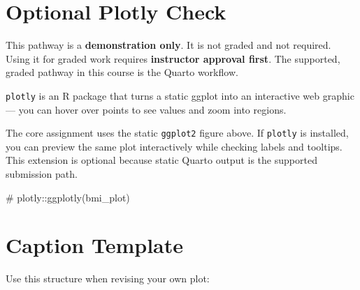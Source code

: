 \documentclass[
  letterpaper,
  DIV=11,
  numbers=noendperiod,
  oneside]{scrreprt}
\newenvironment{Shaded}{\begin{snugshade}}{\end{snugshade}}
\newcommand{\CommentTok}[1]{\textcolor[rgb]{0.37,0.37,0.37}{#1}}
\begin{document}
\section*{Optional Plotly Check}\label{optional-plotly-check}


\begin{tcolorbox}[enhanced jigsaw, title=\textcolor{quarto-callout-warning-color}{\faExclamationTriangle}\hspace{0.5em}{Demo only --- not graded}, arc=.35mm, toptitle=1mm, colframe=quarto-callout-warning-color-frame, toprule=.15mm, leftrule=.75mm, bottomtitle=1mm, opacityback=0, bottomrule=.15mm, coltitle=black, breakable, opacitybacktitle=0.6, titlerule=0mm, colback=white, left=2mm, colbacktitle=quarto-callout-warning-color!10!white, rightrule=.15mm]

This pathway is a \textbf{demonstration only}. It is not graded and not
required. Using it for graded work requires \textbf{instructor approval
first}. The supported, graded pathway in this course is the Quarto
workflow.

\end{tcolorbox}

\texttt{plotly} is an R package that turns a static ggplot into an
interactive web graphic --- you can hover over points to see values and
zoom into regions.

The core assignment uses the static \texttt{ggplot2} figure above. If
\texttt{plotly} is installed, you can preview the same plot
interactively while checking labels and tooltips. This extension is
optional because static Quarto output is the supported submission path.

\begin{Shaded}
\begin{Highlighting}[numbers=left,,]
\CommentTok{\# plotly::ggplotly(bmi\_plot)}
\end{Highlighting}
\end{Shaded}

\section*{Caption Template}\label{caption-template}


Use this structure when revising your own plot:
\end{document}
